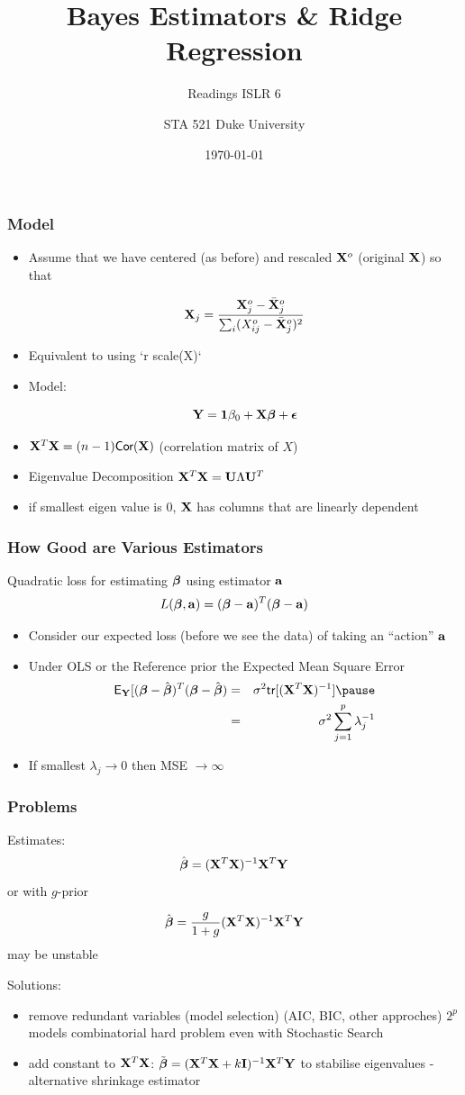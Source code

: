 \documentclass{beamer}\usepackage[]{graphicx}\usepackage[]{color}
\title{Bayes Estimators \& Ridge Regression}
\subtitle{Readings ISLR 6 }
\institute{Merlise Clyde}
\author{STA 521  Duke University}
\date{\today}
\begin{document}
\maketitle
\begin{frame} \frametitle{Model}

\begin{itemize}
\item Assume that we have centered (as before) and rescaled $\mathbf{X}^o$  (original $\mathbf{X}$) so that

$$\mathbf{X}_j =  \frac{\mathbf{X}^o_j - \bar{\mathbf{X}}^o_j}{\sum_i (X^o_{ij} - \bar{\mathbf{X}}^o_j)^2}$$
\pause
\item Equivalent to using `r scale(X)` \pause

\item Model:

$$\mathbf{Y} = \mathbf{1} \beta_0 + \mathbf{X} \boldsymbol{\beta} + \boldsymbol{\epsilon}$$
\pause
\item $\mathbf{X}^T\mathbf{X} = (n-1) \textsf{Cor}(\mathbf{X}) $  (correlation matrix of $X$) \pause
\item Eigenvalue Decomposition $\mathbf{X}^T\mathbf{X} = \mathbf{U} \Lambda \mathbf{U}^T$ \pause
\item if smallest eigen value is 0, $\mathbf{X}$ has columns that are linearly dependent
\end{itemize}
\end{frame}

\begin{frame}
  \frametitle{How Good are  Various Estimators}
Quadratic loss for estimating  $\boldsymbol{\beta}$ using estimator $\mathbf{a}$
$$ L(\boldsymbol{\beta}, \mathbf{a}) =  ( \boldsymbol{\beta} - \mathbf{a})^T(\boldsymbol{\beta} -\mathbf{a})$$ \pause

\begin{itemize}
\item Consider our expected loss (before we see the data) of taking an
``action'' $\mathbf{a}$ \pause
\item Under OLS or the  Reference prior the Expected Mean Square Error  \pause
  \begin{eqnarray*}
\E_\Y[( \b - \bhat)^T(\b -\bhat) & = &\sigma^2
  \tr[(\X^T\X)^{-1}] \pause \\
 & = & \sigma^2 \sum_{j=1}^p \lambda_j^{-1}
  \end{eqnarray*}
\pause
\item If smallest $\lambda_j \to 0$ then MSE $\to \infty$
\end{itemize}
\end{frame}

\begin{frame}
  \frametitle{Problems}
Estimates:
$$\hat{\boldsymbol{\beta}} = (\mathbf{X}^T\mathbf{X})^{-1} \mathbf{X}^T \mathbf{Y}$$  or with $g$-prior

$$\hat{\boldsymbol{\beta}} = \frac{g}{1+g}(\mathbf{X}^T\mathbf{X})^{-1} \mathbf{X}^T \mathbf{Y}$$ may be unstable


Solutions:
  \begin{itemize}
  \item remove redundant variables (model selection)  (AIC, BIC, other approches)  $2^p$ models combinatorial hard problem even with Stochastic Search
\item add constant to  $\mathbf{X}^T\mathbf{X}$:  $\tilde{\boldsymbol{\beta}} = (\mathbf{X}^T\mathbf{X}  + k \mathbf{I})^{-1} \mathbf{X}^T \mathbf{Y}$ to stabilise eigenvalues -  alternative shrinkage estimator
\end{itemize}

\end{frame}
\end{document}
